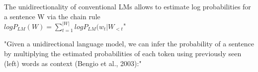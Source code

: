 The unidirectionality of conventional LMs allows to estimate log probabilities for a sentence W via the chain rule \citep{salazar2020masked} \\
$log P_{LM}(W) = \sum_{t=1}^{|W|} log P_{LM}(w_t | W_{<t}$" 

"Given a unidirectional language model, we can infer the probability of a sentence by multiplying the estimated probabilities of each token using
previously seen (left) words as context (Bengio et al., 2003):" \citep{lau2020furiously}






